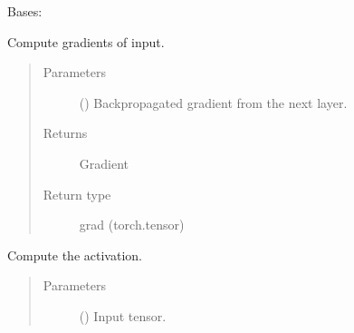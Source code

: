 \documentclass[letterpaper,10pt,english]{sphinxmanual}
\begin{document}
\begin{fulllineitems}
\label{\detokenize{nn:nn.activation.Activation}}
Bases: {\hyperref[\detokenize{nn:nn.module.Module}]{}}

\begin{fulllineitems}
\label{\detokenize{nn:nn.activation.Activation.backward}}
Compute gradients of input.
\begin{quote}\begin{description}
\item[{Parameters}] \leavevmode
{} () \textendash{} Backpropagated gradient from the next layer.

\item[{Returns}] \leavevmode
Gradient

\item[{Return type}] \leavevmode
grad (torch.tensor)

\end{description}\end{quote}

\end{fulllineitems}


\begin{fulllineitems}
\label{\detokenize{nn:nn.activation.Activation.forward}}
Compute the activation.
\begin{quote}\begin{description}
\item[{Parameters}] \leavevmode
{} () \textendash{} Input tensor.

\end{description}\end{quote}

\end{fulllineitems}


\end{fulllineitems}
\end{document}
